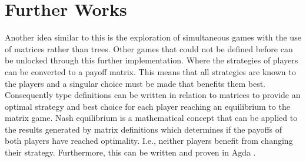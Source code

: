 \documentclass[12pt]{article}
\theoremstyle{definition}
\begin{document}
\section{Further Works}
Another idea similar to this is the exploration of simultaneous games with the use of matrices rather than trees. Other games that could not be defined before can be unlocked through this further implementation. Where the strategies of players can be converted to a payoff matrix. This means that all strategies are known to the players and a singular choice must be made that benefits them best. Consequently type definitions can be written in relation to matrices to provide an optimal strategy and best choice for each player reaching an equilibrium to the matrix game. Nash equilibrium \cite{kreps1989nash} is a mathematical concept that can be applied to the results generated by matrix definitions which determines if the payoffs of both players have reached optimality. I.e., neither players benefit from changing their strategy. Furthermore, this can be written and proven in Agda \cite{leexistence}.




\end{document}
